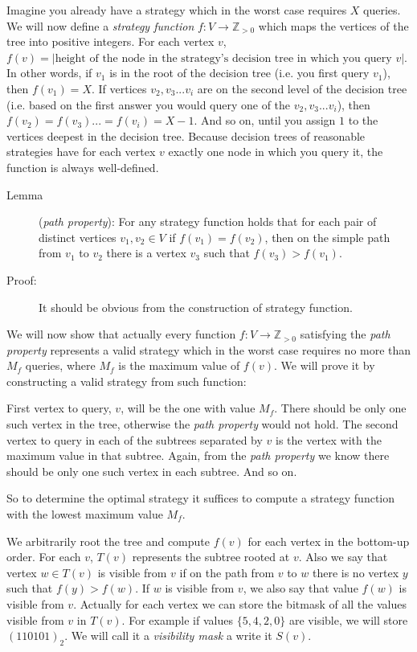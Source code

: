 
Imagine you already have a strategy which in the worst case requires $X$ queries.
We will now define a \emph{strategy function} $f : V \to \mathbb Z_{> 0}$ which maps
the vertices of the tree into positive integers. For each vertex $v$,
$f(v) = |\text{height of the node in the strategy's decision tree in which you query $v$}|$.
In other words, if $v_1$ is in the root of the decision tree (i.e. you first query $v_1$), then $f(v_1) = X$.
If vertices $v_2, v_3 ... v_i$ are on the second level of the decision tree
(i.e. based on the first answer you would query one of the $v_2, v_3 ... v_i$), then $f(v_2) = f(v_3) ... = f(v_i) = X-1$.
And so on, until you assign $1$ to the vertices deepest in the decision tree.
Because decision trees of reasonable strategies have for each vertex $v$ exactly
one node in which you query it, the function is always well-defined.

\begin{description}
\item [Lemma] (\emph{path property}):
For any strategy function holds that for each pair of distinct vertices $v_1, v_2 \in V$ if $f(v_1) = f(v_2)$, then
on the simple path from $v_1$ to $v_2$ there is a vertex $v_3$ such that $f(v_3) > f(v_1)$.
\item[Proof:]
It should be obvious from the construction of strategy function.
\end{description}

We will now show that actually every function $f : V \to \mathbb Z_{> 0}$ satisfying
the \emph{path property} represents a valid strategy which in the worst case
requires no more than $M_f$ queries, where $M_f$ is the maximum value of $f(v)$.
We will prove it by constructing a valid strategy from such function:

First vertex to query, $v$, will be the one with value $M_f$. There should be only
one such vertex in the tree, otherwise the \emph{path property} would not hold.
The second vertex to query in each of the subtrees separated by $v$ is the vertex with
the maximum value in that subtree. Again, from the \emph{path property} we know
there should be only one such vertex in each subtree. And so on.

So to determine the optimal strategy it suffices to compute a strategy function
with the lowest maximum value $M_f$.

We arbitrarily root the tree and compute $f(v)$ for each vertex in the bottom-up order.
For each $v$, $T(v)$ represents the subtree rooted at $v$.
Also we say that vertex $w \in T(v)$ is visible from $v$ if on the path from $v$
to $w$ there is no vertex $y$ such that $f(y) > f(w)$. If $w$ is visible from $v$,
we also say that value $f(w)$ is visible from $v$. Actually for each vertex
we can store the bitmask of all the values visible from $v$ in $T(v)$. For
example if values $\{5,4,2,0\}$ are visible, we will store $(110101)_2$. We will
call it a \emph{visibility mask} a write it $S(v)$.

